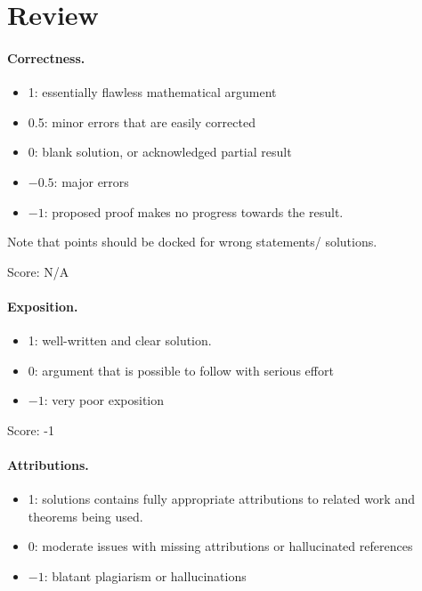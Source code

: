 \documentclass[11pt]{article}
\theoremstyle{definition}
\begin{document}
\maketitle

\section{Review}

\paragraph{Correctness.}
\begin{itemize}
	\item  1: essentially flawless mathematical argument
	\item  0.5: minor errors that are easily corrected
	\item  0: blank solution, or acknowledged partial result
	\item  $-0.5$: major errors
	\item  $-1$: proposed proof makes no progress towards the result.
\end{itemize}
Note that points should be docked for wrong statements/ solutions.

\noindent Score: N/A

\paragraph{Exposition.}
\begin{itemize}
	\item  1: well-written and clear solution.
	\item  0: argument that is possible to follow with serious effort
	\item  $-1$: very poor exposition
\end{itemize}

\noindent Score: -1

\paragraph{Attributions.}
\begin{itemize}
	\item  1: solutions contains fully appropriate attributions
		to related work and theorems being used.
	\item  0: moderate issues with missing attributions or hallucinated references
	\item  $-1$: blatant plagiarism or hallucinations
\end{itemize}
\end{document}
